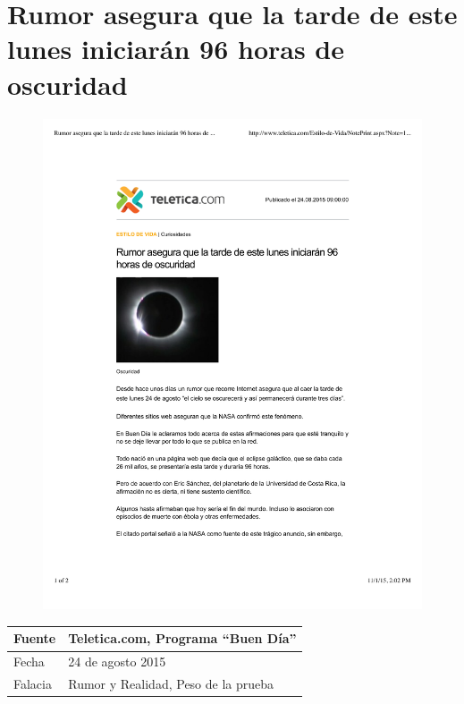 \documentclass[times]{simauth}
\begin{document}
\section{Rumor asegura que la tarde de este lunes iniciarán 96 horas de oscuridad }
\begin{figure}[h!]
    \centering
    \includegraphics[width=17cm]{teletica-rumor}
    \label{fig:falacia2}
\end{figure}

\begin{table}[h!]
    \begin{tabular}{ll} 
        \toprule[1.5pt]
        Fuente & Teletica.com, Programa ``Buen Día''\\
        \midrule[0.5pt]
        Fecha  & 24 de agosto 2015\\
        \midrule[0.5pt]
        Falacia & Rumor y Realidad, Peso de la prueba \\
        \bottomrule[1.5pt]
    \end{tabular} 
\end{table}
\end{document}
